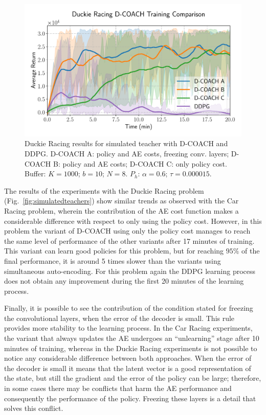 \begin{figure}[h]
    \centering
    \includegraphics[width=0.9\linewidth]{imagenes/cap3/duckie_sim_ICRA.pdf}
    \caption{Duckie Racing results for simulated teacher with D-COACH and DDPG. D-COACH A: policy and AE costs, freezing conv. layers; D-COACH B: policy and AE costs; D-COACH C: only policy cost. Buffer: $K = 1000$; $b = 10$; $N = 8$. $P_{h}$: $\alpha = 0.6$; $\tau = 0.000015$.}
    \label{fig:racing_car_results}
\end{figure}

The results of the experiments with the Duckie Racing problem (Fig.~\ref{fig:simulatedteachers}) show similar trends as observed with the Car Racing problem, wherein the contribution of the AE cost function makes a considerable difference with respect to only using the policy cost. However, in this problem the variant of D-COACH using only the policy cost manages to reach the same level of performance of the other variants after 17 minutes of training. This variant can learn good policies for this problem, but for reaching $95\%$ of the final performance, it is around 5 times slower than the variants using simultaneous auto-encoding. For this problem again the DDPG learning process does not obtain any improvement during the first 20 minutes of the learning process. 

Finally, it is possible to see the contribution of the condition stated for freezing the convolutional layers, when the error of the decoder is small. This rule provides more stability to the learning process. In the Car Racing experiments, the variant that always updates the AE undergoes an ``unlearning'' stage after 10 minutes of training, whereas in the Duckie Racing experiments is not possible to notice any considerable difference between both approaches. When the error of the decoder is small it means that the latent vector is a good representation of the state, but still the gradient and the error of the policy can be large; therefore, in some cases there may be conflicts that harm the AE performance and consequently the performance of the policy. Freezing these layers is a detail that solves this conflict.

